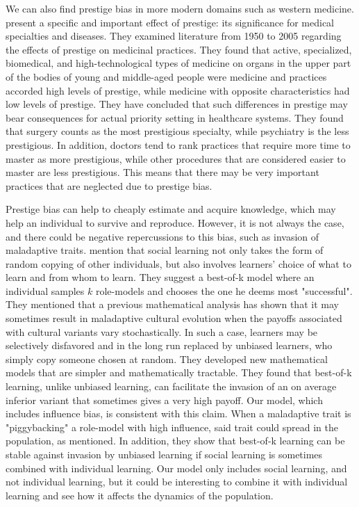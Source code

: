 \documentclass[12pt]{extarticle}
\begin{document}
We can also find prestige bias in more modern domains such as western medicine.
\citet{medical_prestige} present a specific and important effect of prestige: its significance for medical specialties and diseases.
They examined literature from 1950 to 2005 regarding the effects of prestige on medicinal practices. They found that active, specialized, biomedical, and high-technological types of medicine on organs in the upper part of the bodies of young and middle-aged people were medicine and practices accorded high levels of prestige, while medicine with opposite characteristics had low levels of prestige. 
They have concluded that such differences in prestige may bear consequences for actual priority setting in healthcare systems. They found that surgery counts as the most prestigious specialty, while psychiatry is the less prestigious. In addition, doctors tend to rank practices that require more time to master as more prestigious, while other procedures that are considered easier to master are less prestigious. 
This means that there may be very important practices that are neglected due to prestige bias.

Prestige bias can help to cheaply estimate and acquire knowledge, which may help an individual to survive and reproduce. However, it is not always the case, and there could be negative repercussions to this bias, such as invasion of maladaptive traits.
\citet{best_of_k} mention that social learning not only takes the form of random copying of other individuals, but also involves learners' choice of what to learn and from whom to learn. They suggest a best-of-k model where an individual samples $k$ role-models and chooses the one he deems most "successful". They mentioned that a previous mathematical analysis has shown that it may sometimes result in maladaptive cultural evolution when the payoffs associated with cultural variants vary stochastically. In such a case, learners may be selectively disfavored and in the long run replaced by unbiased learners, who simply copy someone chosen at random. They developed new mathematical models that are simpler and mathematically tractable. They found that best-of-k learning, unlike unbiased learning, can facilitate the invasion of an on average inferior variant that sometimes gives a very high payoff. Our model, which includes influence bias, is consistent with this claim. When a maladaptive trait is "piggybacking" a role-model with high influence, said trait could spread in the population, as mentioned.
In addition, they show that best-of-k learning can be stable against invasion by unbiased learning if social learning is sometimes combined with individual learning. 
Our model only includes social learning, and not individual learning, but it could be interesting to combine it with individual learning and see how it affects the dynamics of the population.
\end{document}
